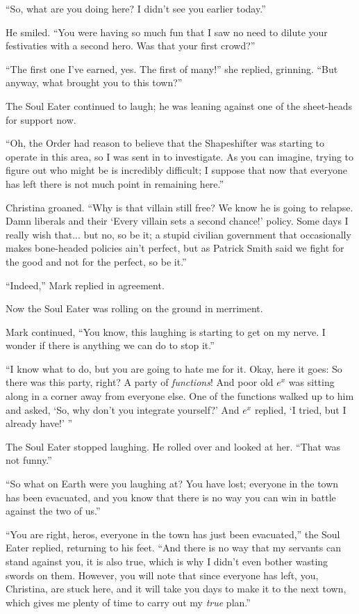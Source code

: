 \documentclass[showtrims,b6paper,draft,10pt]{memoir}
\begin{document}
``So, what are you doing here?  I didn't see you earlier today.''

He smiled.  ``You were having so much fun that I saw no need to dilute your festivaties with a second hero.  Was that your first crowd?''

``The first one I've earned, yes.  The first of many!''  she replied, grinning.  ``But anyway, what brought you to this town?''

The Soul Eater continued to laugh;  he was leaning against one of the sheet-heads for support now.

``Oh, the Order had reason to believe that the Shapeshifter was starting to operate in this area, so I was sent in to investigate.  As you can imagine, trying to figure out who might be is incredibly difficult;  I suppose that now that everyone has left there is not much point in remaining here.''

Christina groaned. ``Why is that villain still free?  We know he is going to relapse.  Damn liberals and their `Every villain sets a second chance!' policy.  Some days I really wish that... but no, so be it;  a stupid civilian government that occasionally makes bone-headed policies ain't perfect, but as Patrick Smith said we fight for the good and not for the perfect, so be it.''

``Indeed,'' Mark replied in agreement.

Now the Soul Eater was rolling on the ground in merriment.

Mark continued, ``You know, this laughing is starting to get on my nerve.  I wonder if there is anything we can do to stop it.''

``I know what to do, but you are going to hate me for it.  Okay, here it goes:  So there was this party, right?  A party of \emph{functions}!  And poor old $e^x$ was sitting along in a corner away from everyone else.  One of the functions walked up to him and asked, `So, why don't you integrate yourself?'  And $e^x$ replied, `I tried, but I already have!' ''

The Soul Eater stopped laughing.  He rolled over and looked at her.  ``That was not funny.''

``So what on Earth were you laughing at?  You have lost;  everyone in the town has been evacuated, and you know that there is no way you can win in battle against the two of us.''

``You are right, heros, everyone in the town has just been evacuated,'' the Soul Eater replied, returning to his feet.  ``And there is no way that my servants can stand against you, it is also true, which is why I didn't even bother wasting swords on them.  However, you will note that since everyone has left, you, Christina, are stuck here, and it will take you days to make it to the next town, which gives me plenty of time to carry out my \emph{true} plan.''
\end{document}
